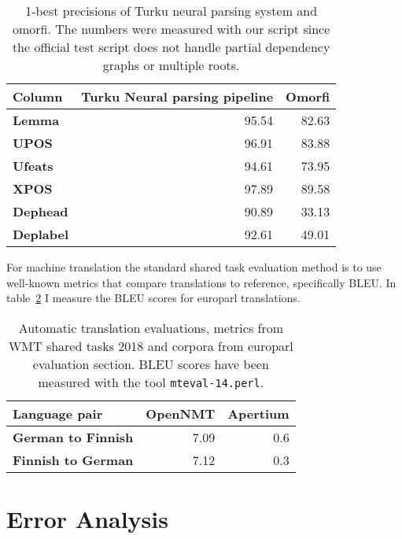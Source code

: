 \documentclass[a4paper,notitlepage]{article}
\begin{document}
\begin{table}
\begin{centering}
    \begin{tabular}{lrr}
        \toprule
    Column & \bf Turku Neural parsing pipeline & \bf Omorfi \\
        \midrule
        \bf Lemma & 95.54 & 82.63 \\
        \bf UPOS & 96.91 & 83.88 \\
        \bf Ufeats & 94.61 & 73.95\\
        \bf XPOS & 97.89 & 89.58 \\
        \bf Dephead & 90.89 & 33.13 \\
        \bf Deplabel & 92.61 & 49.01 \\
        \bottomrule
    \end{tabular}
    \caption{1-best precisions of Turku neural parsing system and
    omorfi. The numbers were measured with our script since the official
    test script does not handle partial dependency graphs or multiple roots.
\label{table:eval-ud}}
\end{centering}
\end{table}

For machine translation the standard shared task evaluation method is to
use well-known metrics that compare translations to reference, specifically
BLEU\@. In table~\ref{table:eval-wmt} I measure the BLEU scores for europarl
translations.

\begin{table}
\begin{centering}
    \begin{tabular}{lrr}
        \toprule
    Language pair & \bf OpenNMT & \bf Apertium \\
        \midrule
        \bf German to Finnish & 7.09 & 0.6 \\
        \bf Finnish to German & 7.12 & 0.3  \\
        \bottomrule
    \end{tabular}
    \caption{Automatic translation evaluations, metrics from WMT shared
    tasks 2018 and corpora from europarl evaluation section. BLEU scores have
    been measured with the tool \texttt{mteval-14.perl}.
\label{table:eval-wmt}}
\end{centering}
\end{table}


\section{Error Analysis}
\label{sec:errors}
\end{document}
